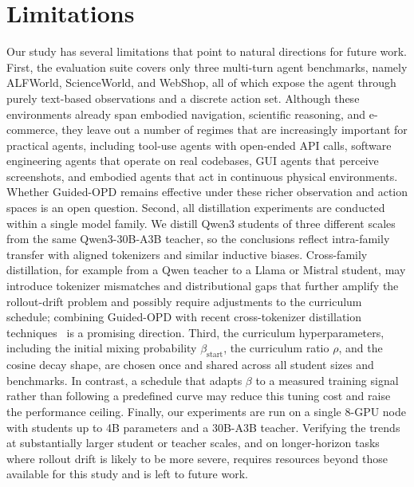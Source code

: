 \documentclass[11pt]{article}
\begin{document}
\section*{Limitations}
Our study has several limitations that point to natural directions for future work.
First, the evaluation suite covers only three multi-turn agent benchmarks, namely ALFWorld, ScienceWorld, and WebShop, all of which expose the agent through purely text-based observations and a discrete action set. Although these environments already span embodied navigation, scientific reasoning, and e-commerce, they leave out a number of regimes that are increasingly important for practical agents, including tool-use agents with open-ended API calls, software engineering agents that operate on real codebases, GUI agents that perceive screenshots, and embodied agents that act in continuous physical environments. Whether Guided-OPD remains effective under these richer observation and action spaces is an open question.
Second, all distillation experiments are conducted within a single model family. We distill Qwen3 students of three different scales from the same Qwen3-30B-A3B teacher, so the conclusions reflect intra-family transfer with aligned tokenizers and similar inductive biases. Cross-family distillation, for example from a Qwen teacher to a Llama or Mistral student, may introduce tokenizer mismatches and distributional gaps that further amplify the rollout-drift problem and possibly require adjustments to the curriculum schedule; combining Guided-OPD with recent cross-tokenizer distillation techniques~\citep{sun2026simct} is a promising direction.
Third, the curriculum hyperparameters, including the initial mixing probability $\beta_{\text{start}}$, the curriculum ratio $\rho$, and the cosine decay shape, are chosen once and shared across all student sizes and benchmarks. In contrast, a schedule that adapts $\beta$ to a measured training signal rather than following a predefined curve may reduce this tuning cost and raise the performance ceiling.
Finally, our experiments are run on a single 8-GPU node with students up to 4B parameters and a 30B-A3B teacher. Verifying the trends at substantially larger student or teacher scales, and on longer-horizon tasks where rollout drift is likely to be more severe, requires resources beyond those available for this study and is left to future work.

\end{document}
